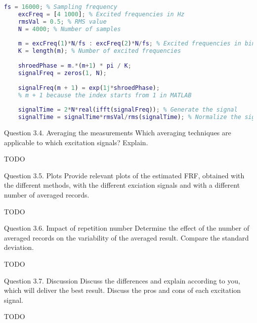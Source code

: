 \begin{lstlisting}[language=Matlab]
    fs = 16000; % Sampling frequency
    excFreq = [4 1000]; % Excited frequencies in Hz
    rmsVal = 0.5; % RMS value
    N = 4000; % Number of samples
    
    m = excFreq(1)*N/fs : excFreq(2)*N/fs; % Excited frequencies in bins
    K = length(m); % Number of excited frequencies
    
    shroedPhase = m.*(m+1) * pi / K;
    signalFreq = zeros(1, N);
    
    signalFreq(m + 1) = exp(1j*shroedPhase);
    % m + 1 because the index starts from 1 in MATLAB
    
    signalTime = 2*N*real(ifft(signalFreq)); % Generate the signal
    signalTime = signalTime*rmsVal/rms(signalTime); % Normalize the signal
\end{lstlisting}


\begin{Task}{Question 3.4. Averaging the measurements}
    Which averaging techniques are applicable to which excitation signals? Explain.
\end{Task}

\huge{TODO}
\normalsize

\begin{Task}{Question 3.5. Plots}
    Provide relevant plots of the estimated FRF, obtained with the different methods, with the different exciation signals and with a different number of averaged records.
\end{Task}

\huge{TODO}
\normalsize

\begin{Task}{Question 3.6. Impact of repetition number}
    Determine the effect of the number of averaged records on the variability of the averaged result. Compare the standard deviation.
\end{Task}

\huge{TODO}
\normalsize

\begin{Task}{Question 3.7. Discussion}
    Discuss the differences and explain according to you, which will deliver the best result. Discuss the pros and cons of each excitation signal.
\end{Task}

\huge{TODO}
\normalsize
